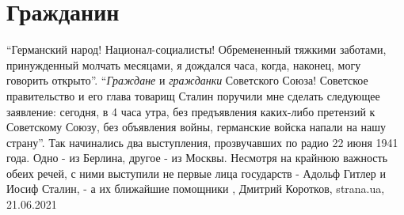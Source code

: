  
 
 
 
 
\chapter{Гражданин}

\enquote{Германский народ! Национал-социалисты! Обремененный тяжкими заботами,
принужденный молчать месяцами, я дождался часа, когда, наконец, могу говорить
открыто}.  \enquote{\emph{Граждане} и \emph{гражданки} Советского Союза!
Советское правительство и его глава товарищ Сталин поручили мне сделать
следующее заявление: сегодня, в 4 часа утра, без предъявления каких-либо
претензий к Советскому Союзу, без объявления войны, германские войска напали на
нашу страну}. Так начинались два выступления, прозвучавших по радио 22 июня
1941 года. Одно - из Берлина, другое - из Москвы. Несмотря на крайнюю важность
обеих речей, с ними выступили не первые лица государств - Адольф Гитлер и Иосиф
Сталин, - а их ближайшие помощники
, Дмитрий Коротков, strana.ua, 21.06.2021

